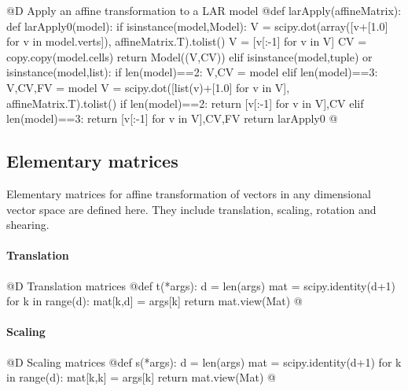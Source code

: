 \documentclass[11pt,oneside]{article}    %
\begin{document}
@D Apply an affine transformation to a LAR model 
@{def larApply(affineMatrix):
    def larApply0(model):
        if isinstance(model,Model):
            V = scipy.dot(array([v+[1.0] for v in model.verts]), affineMatrix.T).tolist()
            V = [v[:-1] for v in V]
            CV = copy.copy(model.cells)
            return Model((V,CV))
        elif isinstance(model,tuple) or isinstance(model,list):
            if len(model)==2: V,CV = model
            elif len(model)==3: V,CV,FV = model
            V = scipy.dot([list(v)+[1.0] for v in V], affineMatrix.T).tolist()
            if len(model)==2: return [v[:-1] for v in V],CV
            elif len(model)==3: return [v[:-1] for v in V],CV,FV
    return larApply0
@}


\subsection{Elementary matrices}
Elementary matrices for affine transformation of vectors in any dimensional vector space are defined here. They include translation, scaling, rotation and shearing. 

\paragraph{Translation}
@D Translation matrices
@{def t(*args): 
    d = len(args)
    mat = scipy.identity(d+1)
    for k in range(d): 
        mat[k,d] = args[k]
    return mat.view(Mat)
@}
\paragraph{Scaling}
@D Scaling matrices
@{def s(*args): 
    d = len(args)
    mat = scipy.identity(d+1)
    for k in range(d): 
        mat[k,k] = args[k]
    return mat.view(Mat)
@}
\end{document}
